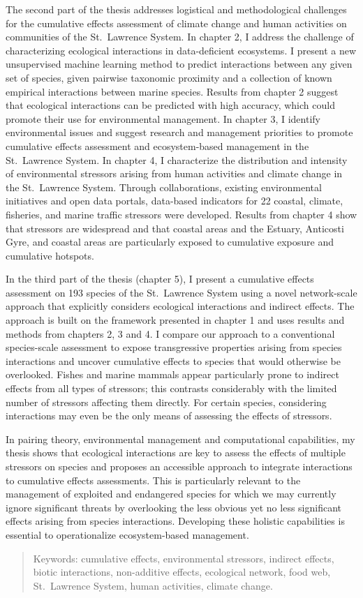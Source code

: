 The second part of the thesis addresses logistical and methodological
challenges for the cumulative effects assessment of climate change and
human activities on communities of the St.~Lawrence System. In chapter
2, I address the challenge of characterizing ecological interactions in
data-deficient ecosystems. I present a new unsupervised machine learning
method to predict interactions between any given set of species, given
pairwise taxonomic proximity and a collection of known empirical
interactions between marine species. Results from chapter 2 suggest that
ecological interactions can be predicted with high accuracy, which could
promote their use for environmental management. In chapter 3, I identify
environmental issues and suggest research and management priorities to
promote cumulative effects assessment and ecosystem-based management in
the St.~Lawrence System. In chapter 4, I characterize the distribution
and intensity of environmental stressors arising from human activities
and climate change in the St.~Lawrence System. Through collaborations,
existing environmental initiatives and open data portals, data-based
indicators for 22 coastal, climate, fisheries, and marine traffic
stressors were developed. Results from chapter 4 show that stressors are
widespread and that coastal areas and the Estuary, Anticosti Gyre, and
coastal areas are particularly exposed to cumulative exposure and
cumulative hotspots.

In the third part of the thesis (chapter 5), I present a cumulative
effects assessment on 193 species of the St.~Lawrence System using a
novel network-scale approach that explicitly considers ecological
interactions and indirect effects. The approach is built on the
framework presented in chapter 1 and uses results and methods from
chapters 2, 3 and 4. I compare our approach to a conventional
species-scale assessment to expose transgressive properties arising from
species interactions and uncover cumulative effects to species that
would otherwise be overlooked. Fishes and marine mammals appear
particularly prone to indirect effects from all types of stressors; this
contrasts considerably with the limited number of stressors affecting
them directly. For certain species, considering interactions may even be
the only means of assessing the effects of stressors.

In pairing theory, environmental management and computational
capabilities, my thesis shows that ecological interactions are key to
assess the effects of multiple stressors on species and proposes an
accessible approach to integrate interactions to cumulative effects
assessments. This is particularly relevant to the management of
exploited and endangered species for which we may currently ignore
significant threats by overlooking the less obvious yet no less
significant effects arising from species interactions. Developing these
holistic capabilities is essential to operationalize ecosystem-based
management.

\begin{quote}
Keywords: cumulative effects, environmental stressors, indirect effects,
biotic interactions, non-additive effects, ecological network, food web,
St.~Lawrence System, human activities, climate change.
\end{quote}
